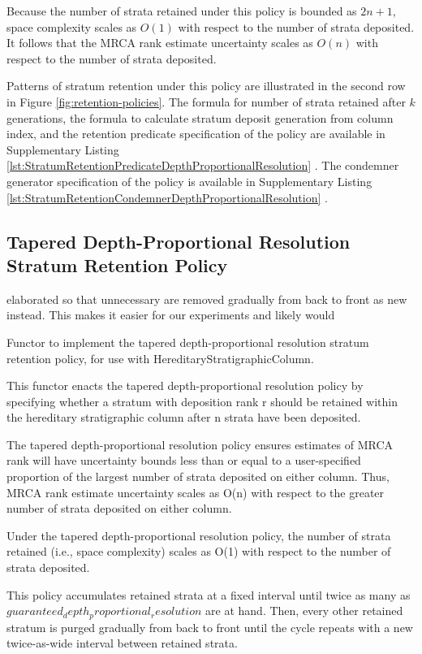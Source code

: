 Because the number of strata retained under this policy is bounded as $2n+1$, space complexity scales as $O(1)$ with respect to the number of strata deposited.
It follows that the MRCA rank estimate uncertainty scales as $O(n)$ with respect to the number of strata deposited.

Patterns of stratum retention under this policy are illustrated in the second row in Figure \ref{fig:retention-policies}.
The formula for number of strata retained after $k$ generations, the formula to calculate stratum deposit generation from column index, and the retention predicate specification of the policy are available in Supplementary Listing \ref{lst:StratumRetentionPredicateDepthProportionalResolution} \citep{moreno2022hstratconceptsupplement}.
The condemner generator specification of the policy is available in Supplementary Listing \ref{lst:StratumRetentionCondemnerDepthProportionalResolution} \citep{moreno2022hstratconceptsupplement}.

\subsection{Tapered Depth-Proportional Resolution Stratum Retention Policy}

elaborated so that unnecessary are removed gradually from back to front as new instead.
This makes it easier for our experiments and likely would

Functor to implement the tapered depth-proportional resolution stratum
retention policy, for use with HereditaryStratigraphicColumn.

This functor enacts the tapered depth-proportional resolution policy by
specifying whether a stratum with deposition rank r should be retained
within the hereditary stratigraphic column after n strata have been
deposited.

The tapered depth-proportional resolution policy ensures estimates of MRCA
rank will have uncertainty bounds less than or equal to a user-specified
proportion of the largest number of strata deposited on either column.
Thus, MRCA rank estimate uncertainty scales as O(n) with respect to the
greater number of strata deposited on either column.

Under the tapered depth-proportional resolution policy, the number of strata
retained (i.e., space complexity) scales as O(1) with respect to the number
of strata deposited.

This policy accumulates retained strata at a fixed interval until twice
as many as $guaranteed_depth_proportional_resolution$ are at hand. Then,
every other retained stratum is purged gradually from back to front
until the cycle repeats with a new twice-as-wide interval between
retained strata.

